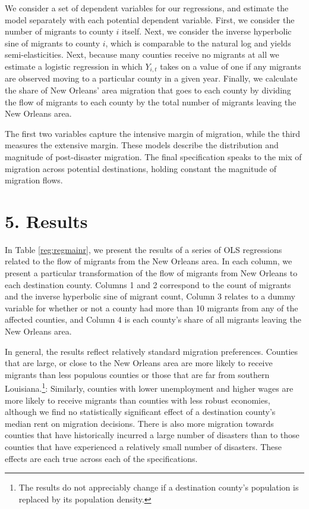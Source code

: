 \documentclass[]{article}
\begin{document}
We consider a set of dependent variables for our regressions, and
estimate the model separately with each potential dependent variable.
First, we consider the number of migrants to county \(i\) itself. Next,
we consider the inverse hyperbolic sine of migrants to county \(i\),
which is comparable to the natural log and yields semi-elasticities.
Next, because many counties receive no migrants at all we estimate a
logistic regression in which \(Y_{i,t}\) takes on a value of one if any
migrants are observed moving to a particular county in a given year.
Finally, we calculate the share of New Orleans' area migration that goes
to each county by dividing the flow of migrants to each county by the
total number of migrants leaving the New Orleans area.

The first two variables capture the intensive margin of migration, while
the third measures the extensive margin. These models describe the
distribution and magnitude of post-disaster migration. The final
specification speaks to the mix of migration across potential
destinations, holding constant the magnitude of migration flows.

\section{\texorpdfstring{5. Results
\label{sec:results}}{5. Results }}\label{results}


In Table \ref{reg:regmainr}, we present the results of a series of OLS
regressions related to the flow of migrants from the New Orleans area.
In each column, we present a particular transformation of the flow of
migrants from New Orleans to each destination county. Columns 1 and 2
correspond to the count of migrants and the inverse hyperbolic sine of
migrant count, Column 3 relates to a dummy variable for whether or not a
county had more than 10 migrants from any of the affected counties, and
Column 4 is each county's share of all migrants leaving the New Orleans
area.

In general, the results reflect relatively standard migration
preferences. Counties that are large, or close to the New Orleans area
are more likely to receive migrants than less populous counties or those
that are far from southern Louisiana.\footnote{The results do not
  appreciably change if a destination county's population is replaced by
  its population density.}: Similarly, counties with lower unemployment
and higher wages are more likely to receive migrants than counties with
less robust economies, although we find no statistically significant
effect of a destination county's median rent on migration decisions.
There is also more migration towards counties that have historically
incurred a large number of disasters than to those counties that have
experienced a relatively small number of disasters. These effects are
each true across each of the specifications.
\end{document}
